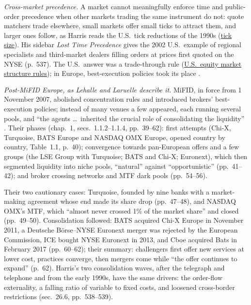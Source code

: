\begin{qfmechanism}
\emph{Cross-market precedence.} A market cannot meaningfully enforce time and public-order precedence when other markets trading the same instrument do not: quote matchers trade elsewhere, small markets offer small ticks to attract them, and larger ones follow, as Harris reads the U.S.\ tick reductions of the 1990s (\hyperref[def:tick-size]{tick size}). His sidebar \emph{Lost Time Precedence} gives the 2002 U.S.\ example of regional specialists and third-market dealers filling orders at prices first quoted on the NYSE (p.~537). The U.S.\ answer was a trade-through rule (\hyperref[rule:us-equity-market-structure]{U.S.\ equity market structure rules}); in Europe, best-execution policies took its place \citep[chap.~1, sec.~1.1.2, p.~43]{alpha-laruelle}.

 \emph{Post-MiFID Europe, as Lehalle and Laruelle describe it.} MiFID, in force from 1 November 2007, abolished concentration rules and introduced brokers' best-execution policies; instead of many venues a few appeared, each running several pools, and ``the agents \dots\ inherited the crucial role of consolidating the liquidity'' \citep[Introduction, p.~17]{alpha-laruelle}. Their phases (chap.~1, secs.~1.1.2--1.1.4, pp.~39--62): first attempts (Chi-X, Turquoise, BATS Europe and NASDAQ OMX Europe, opened country by country, Table~1.1, p.~40); convergence towards pan-European offers and a few groups (the LSE Group with Turquoise; BATS and Chi-X; Euronext), which then segmented liquidity into niche pools, ``natural'' against ``opportunistic'' (pp.~41--42); and broker crossing networks and MTF dark pools (pp.~54--56).

Their two cautionary cases: Turquoise, founded by nine banks with a market-making agreement whose end made its share drop (pp.~47--48), and NASDAQ OMX's MTF, which ``almost never crossed 1\% of the market share'' and closed (pp.~49--50). Consolidation followed: BATS acquired Chi-X Europe in November 2011, a Deutsche Börse--NYSE Euronext merger was rejected by the European Commission, ICE bought NYSE Euronext in 2013, and Cboe acquired Bats in February 2017 (pp.~60--62); their summary: challengers first offer new services at lower cost, practices converge, then mergers come while ``the offer continues to expand'' (p.~62). Harris's two consolidation waves, after the telegraph and telephone and from the early 1990s, have the same drivers: the order-flow externality, a falling ratio of variable to fixed costs, and loosened cross-border restrictions (sec.~26.6, pp.~538--539).


\end{qfmechanism}
